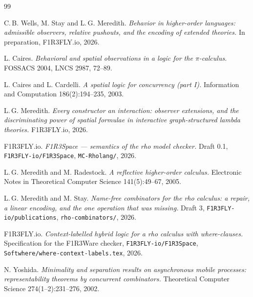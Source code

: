 \documentclass[11pt]{article}
\theoremstyle{plain}
\theoremstyle{definition}
\theoremstyle{remark}
\begin{document}
\sloppy
\begin{thebibliography}{99}

 C.\,B. Wells, M. Stay and L.\,G. Meredith.
\emph{Behavior in higher-order languages: admissible observers, relative
pushouts, and the encoding of extended theories.}
In preparation, F1R3FLY.io, 2026.

 L. Caires.
\emph{Behavioral and spatial observations in a logic for the $\pi$-calculus.}
FOSSACS 2004, LNCS 2987, 72--89.

 L. Caires and L. Cardelli.
\emph{A spatial logic for concurrency (part I).}
Information and Computation 186(2):194--235, 2003.

 L.\,G. Meredith.
\emph{Every constructor an interaction: observer extensions, and the
discriminating power of spatial formulae in interactive graph-structured lambda
theories.}
F1R3FLY.io, 2026.

 F1R3FLY.io.
\emph{F1R3Space --- semantics of the rho model checker.}
Draft 0.1, \texttt{F1R3FLY-io/\allowbreak F1R3Space}, \texttt{MC-Rholang/}, 2026.

 L.\,G. Meredith and M. Radestock.
\emph{A reflective higher-order calculus.}
Electronic Notes in Theoretical Computer Science 141(5):49--67, 2005.

 L.\,G. Meredith and M. Stay.
\emph{Name-free combinators for the rho calculus: a repair, a linear encoding,
and the one operation that was missing.}
Draft 3, \texttt{F1R3FLY-io/\allowbreak publications}, \texttt{rho-combinators/}, 2026.

 F1R3FLY.io.
\emph{Context-labelled hybrid logic for a rho calculus with where-clauses.}
Specification for the F1R3Ware checker,
\texttt{F1R3FLY-io/\allowbreak F1R3Space}, \texttt{Softwhere/\allowbreak where-\allowbreak context-\allowbreak labels.tex},
2026.

 N. Yoshida.
\emph{Minimality and separation results on asynchronous mobile processes:
representability theorems by concurrent combinators.}
Theoretical Computer Science 274(1--2):231--276, 2002.

\end{thebibliography}
\end{document}
